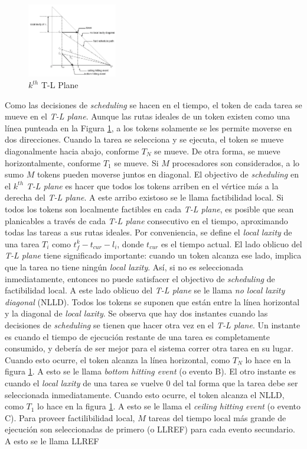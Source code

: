 \begin{figure}
    \centering
    \includegraphics[width=0.35\textwidth]{figure-3}
    \caption{$k^{th}$ T-L Plane}
    \label{fig:figure-3}
\end{figure}

Como las decisiones de \emph{scheduling} se hacen en el tiempo, el token de cada tarea se mueve en el \emph{T-L plane}. Aunque las rutas ideales de un token existen como una línea punteada en la Figura \ref{fig:figure-3}, a los tokens solamente se les permite moverse en dos direcciones. Cuando la tarea se selecciona y se ejecuta, el token se mueve diagonalmente hacia abajo, conforme $T_N$ se mueve. De otra forma, se mueve horizontalmente, conforme $T_1$ se mueve. Si $M$ procesadores son considerados, a lo sumo $M$ tokens pueden moverse juntos en diagonal. El objectivo de \emph{scheduling} en el $k^{th}$ \emph{T-L plane} es hacer que todos los tokens arriben en el vértice más a la derecha del \emph{T-L plane}. A este arribo existoso se le llama factibilidad local. Si todos los tokens son localmente factibles en cada \emph{T-L plane}, es posible que sean planicables a través de cada \emph{T-L plane} consecutivo en el tiempo, aproximando todas las tareas a sus rutas ideales. Por conveniencia, se define el \emph{local laxity} de una tarea $T_i$ como $t_{f}^{k} - t_{cur} - l_i$, donde $t_{cur}$ es el tiempo actual. El lado oblicuo del \emph{T-L plane} tiene significado importante: cuando un token alcanza ese lado, implica que la tarea no tiene ningún \emph{local laxity}. Así, si no es seleccionada inmediatamente, entonces no puede satisfacer el objectivo de \emph{scheduling} de factibilidad local. A este lado oblicuo del \emph{T-L plane} se le llama \emph{no local laxity diagonal} (NLLD). Todos los tokens se suponen que están entre la línea horizontal y la diagonal de \emph{local laxity}. Se observa que hay dos instantes cuando las decisiones de \emph{scheduling} se tienen que hacer otra vez en el \emph{T-L plane}. Un instante es cuando el tiempo de ejecución restante de una tarea es completamente consumido, y debería de ser mejor para el sistema correr otra tarea en su lugar. Cuando esto ocurre, el token alcanza la línea horizontal, como $T_N$ lo hace en la figura \ref{fig:figure-3}. A esto se le llama \emph{bottom hitting event} (o evento B). El otro instante es cuando el \emph{local laxity} de una tarea se vuelve 0 del tal forma que la tarea debe ser seleccionada inmediatamente. Cuando esto ocurre, el token alcanza el NLLD, como $T_1$ lo hace en la figura \ref{fig:figure-3}. A esto se le llama el \emph{ceiling hitting event} (o evento C). Para proveer factilibilidad local, $M$ tareas del tiempo local más grande de ejecución son seleccionadas de primero (o LLREF) para cada evento secundario. A esto se le llama LLREF 